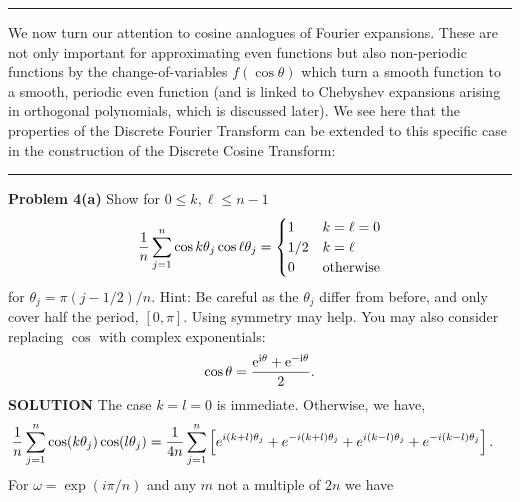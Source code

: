 \documentclass[12pt,a4paper]{article}
\begin{document}
\rule{\textwidth}{1pt}
We now turn our attention to cosine analogues of Fourier expansions. These are not only important for approximating  even functions but also non-periodic functions by the change-of-variables $f(\cos \ensuremath{\theta})$ which turn a smooth function to a smooth, periodic even function (and is linked to Chebyshev expansions arising in orthogonal polynomials, which is discussed later). We see here that the properties of the Discrete Fourier Transform can be extended to this specific case in the construction of the Discrete Cosine Transform:

\rule{\textwidth}{1pt}
\textbf{Problem 4(a)} Show for $0 \ensuremath{\leq} k,\ensuremath{\ell} \ensuremath{\leq} n-1$
\[
{1 \over n} \ensuremath{\sum}_{j=1}^n \cos k \ensuremath{\theta}_j \cos \ensuremath{\ell} \ensuremath{\theta}_j = \begin{cases} 1 & k = \ensuremath{\ell} = 0 \\
                                                  1/2 & k = \ensuremath{\ell} \\
                                                  0 & \hbox{otherwise}
                                                  \end{cases}
\]
for $\ensuremath{\theta}_j = \ensuremath{\pi}(j-1/2)/n$. Hint: Be careful as the $\ensuremath{\theta}_j$ differ from before, and only cover half the period, $[0,\ensuremath{\pi}]$. Using symmetry may help. You may also consider replacing $\cos$ with complex exponentials:
\[
\cos \ensuremath{\theta} = {{\rm e}^{{\rm i}\ensuremath{\theta}} + {\rm e}^{-{\rm i}\ensuremath{\theta}} \over 2}.
\]
\textbf{SOLUTION} The case $k = l = 0$ is immediate. Otherwise, we have,
\begin{align*}
\frac{1}{n}\ensuremath{\sum}_{j=1}^n \cos(k\ensuremath{\theta}_j)\cos(l\ensuremath{\theta}_j) &= {1 \over 4n}\ensuremath{\sum}_{j=1}^n \br[e^{i(k+l)\ensuremath{\theta}_j} + e^{-i(k+l)\ensuremath{\theta}_j} + e^{i(k-l)\ensuremath{\theta}_j} + e^{-i(k-l)\ensuremath{\theta}_j}].
\end{align*}
For $\ensuremath{\omega} = \exp(i \ensuremath{\pi}/n)$ and any $m$ not a multiple of $2n$ we have
\end{document}
